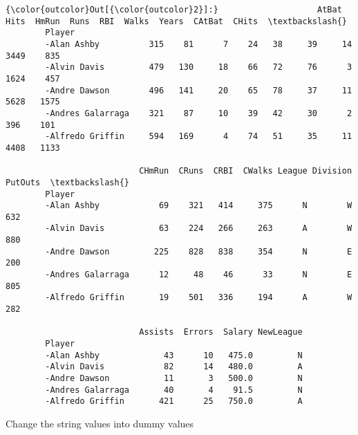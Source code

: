 \documentclass[11pt]{article}
\begin{document}
\begin{Verbatim}[commandchars=\\\{\}]
{\color{outcolor}Out[{\color{outcolor}2}]:}                    AtBat  Hits  HmRun  Runs  RBI  Walks  Years  CAtBat  CHits  \textbackslash{}
        Player                                                                          
        -Alan Ashby          315    81      7    24   38     39     14    3449    835   
        -Alvin Davis         479   130     18    66   72     76      3    1624    457   
        -Andre Dawson        496   141     20    65   78     37     11    5628   1575   
        -Andres Galarraga    321    87     10    39   42     30      2     396    101   
        -Alfredo Griffin     594   169      4    74   51     35     11    4408   1133   
        
                           CHmRun  CRuns  CRBI  CWalks League Division  PutOuts  \textbackslash{}
        Player                                                                    
        -Alan Ashby            69    321   414     375      N        W      632   
        -Alvin Davis           63    224   266     263      A        W      880   
        -Andre Dawson         225    828   838     354      N        E      200   
        -Andres Galarraga      12     48    46      33      N        E      805   
        -Alfredo Griffin       19    501   336     194      A        W      282   
        
                           Assists  Errors  Salary NewLeague  
        Player                                                
        -Alan Ashby             43      10   475.0         N  
        -Alvin Davis            82      14   480.0         A  
        -Andre Dawson           11       3   500.0         N  
        -Andres Galarraga       40       4    91.5         N  
        -Alfredo Griffin       421      25   750.0         A  
\end{Verbatim}
            
    Change the string values into dummy values
\end{document}
